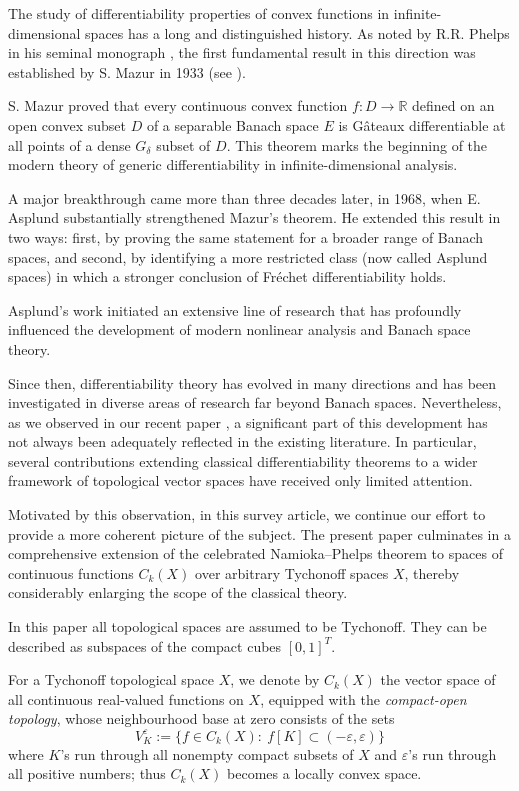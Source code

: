 \documentclass[12pt]{amsart}
\theoremstyle{plain}
\theoremstyle{definition}
\theoremstyle{remark}
\def\ee{\varepsilon}
\def\ee{\varepsilon}
\def\ee{\varepsilon}
\begin{document}
The study of differentiability properties of convex functions in infinite-dimensional spaces has a long and distinguished history. As noted by R.R. Phelps in his seminal monograph \cite{p}, the first fundamental result in this direction was established by S. Mazur in 1933 (see \cite{Mazur}).

S. Mazur proved that every continuous convex function $f:D\to\mathbb{R}$ defined on an open convex subset $D$ of a separable Banach space $E$ is G\^ateaux differentiable at all points of a dense $G_\delta$ subset of $D$. This theorem marks the beginning of the modern theory of generic differentiability in infinite-dimensional analysis.

A major breakthrough came more than three decades later, in 1968, when E. Asplund \cite{Asplund} substantially strengthened Mazur's theorem.
He extended this result in two ways: first, by proving the same statement for a broader range of Banach spaces, and second, by identifying a more restricted class (now called Asplund spaces)
in which a stronger conclusion of Fr\'echet differentiability holds.

Asplund's work initiated an extensive line of research that has profoundly influenced the development of modern nonlinear analysis and Banach space theory.

Since then, differentiability theory has evolved in many directions and has been investigated in diverse areas of research far beyond Banach spaces.
Nevertheless, as we observed in our recent paper \cite{KL3}, a significant part of this development has not always been adequately reflected in the existing literature. In particular, several contributions extending classical differentiability theorems to a wider framework of topological vector spaces have received only limited attention.

Motivated by this observation, in this survey article, we continue our effort to provide a more coherent picture of the subject.
The present paper culminates in a comprehensive extension of the celebrated Namioka--Phelps theorem to spaces of continuous functions $C_k(X)$ over arbitrary Tychonoff spaces $X$, thereby considerably enlarging the scope of the classical theory.

In this paper all topological spaces are assumed to be Tychonoff.
They can be described as subspaces of the compact cubes $[0,1]^{T}$.

For a Tychonoff topological space $X$, we denote by
$C_k(X)$ the vector space of all continuous real-valued functions on $X$, equipped with the {\it compact-open topology},
 whose neighbourhood base at zero consists of the sets
$$
V^\ee_K:= \{f\in C_k(X):\ f[K]\subset (-\ee,\ee)\}
$$
where $K$'s run through all nonempty compact subsets of $X$ and $\ee$'s run through all positive numbers; thus $C_k(X)$ becomes a locally convex space.
\end{document}
